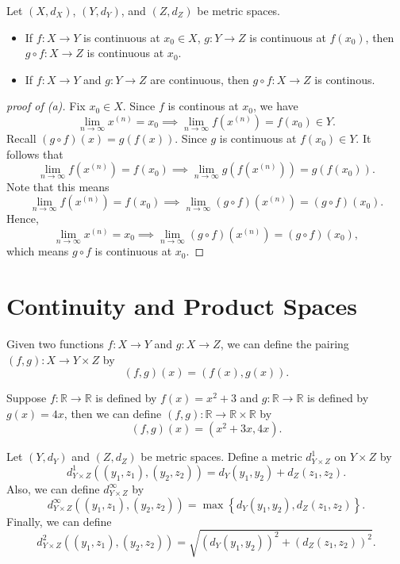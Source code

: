 \begin{corollary}
    Let \((X, d_X)\), \((Y, d_Y)\), and \((Z, d_Z)\) be metric spaces. 
    \begin{itemize}
        \item [(a)] If \(f:X \to Y\) is continuous at \(x_0 \in X\), \(g: Y \to Z\) is continuous at \(f(x_0)\), then \(g \circ f: X \to Z\) is continuous at \(x_0\).   
        \item [(b)] If \(f:X \to Y\) and \(g:Y \to Z\) are continuous, then \(g \circ f:  X \to Z\) is continous.   
    \end{itemize}   
\end{corollary}
\begin{proof}[proof of (a)]
    Fix \(x_0 \in X\). Since \(f\) is continous at \(x_0\), we have 
    \[
        \lim_{n \to \infty} x^{(n)} = x_0 \implies \lim_{n \to \infty} f \left( x^{(n)} \right) = f(x_0) \in Y.   
    \]  
    Recall \( \left( g \circ f  \right) (x) = g(f(x))\). Since \(g\) is continuous at \(f(x_0) \in Y\). It follows that 
    \[
        \lim_{n \to \infty} f \left( x^{(n)} \right) = f(x_0) \implies \lim_{n \to \infty} g \left( f \left( x^{(n)} \right)  \right) = g(f(x_0)).   
    \]  Note that this means 
    \[
        \lim_{n \to \infty} f \left( x^{(n)} \right) = f(x_0) \implies \lim_{n \to \infty} \left( g \circ f \right)\left( x^{(n)} \right) = (g \circ f) (x_0).     
    \] 
    Hence, 
    \[
        \lim_{n \to \infty} x^{(n)} = x_0 \implies \lim_{n \to \infty} \left( g \circ f \right)\left( x^{(n)} \right) = (g \circ f) (x_0), 
    \] which means \(g \circ f\) is continuous at \(x_0\).   
\end{proof}

\section{Continuity and Product Spaces}
Given two functions \(f: X \to Y\) and \(g: X \to Z\), we can define the pairing \((f, g): X \to Y \times Z\) by 
\[
    (f, g)(x) = (f(x), g(x)).
\]   

\begin{eg}
    Suppose \(f:\mathbb{R} \to \mathbb{R} \) is defined by \(f(x) = x^2 + 3\) and \(g: \mathbb{R} \to \mathbb{R} \) is defined by \(g(x) = 4x\), then we can define \((f, g): \mathbb{R} \to \mathbb{R} \times \mathbb{R} \) by 
    \[
        (f, g)(x) = (x^2 + 3x, 4x).
    \]  
\end{eg}

\begin{definition} \label{def: product metric}
   Let \((Y, d_Y)\) and \((Z, d_Z)\) be metric spaces. Define a metric \(d_{Y \times Z}^1\) on \(Y \times Z\) by 
   \[
    d_{Y\times Z}^1 \left( (y_1, z_1), (y_2, z_2) \right) = d_Y(y_1, y_2) + d_Z(z_1, z_2). 
   \] Also, we can define \(d_{Y \times Z}^{\infty} \) by 
   \[
    d_{Y \times Z}^{\infty} \left( (y_1, z_1), (y_2, z_2) \right) = \max \left\{ d_Y (y_1, y_2), d_Z(z_1, z_2) \right\}.  
   \] Finally, we can define 
   \[
    d_{Y \times Z}^2 \left( (y_1, z_1), (y_2, z_2) \right) = \sqrt{\left( d_Y (y_1, y_2) \right)^2 + \left( d_Z(z_1, z_2) \right)^2  }.  
   \]  
\end{definition}


